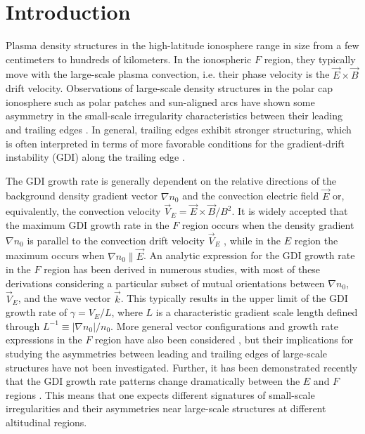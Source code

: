 \section{Introduction}
\label{sec:p2intro}
Plasma density structures in the high-latitude ionosphere range in size from a few centimeters to hundreds of kilometers. In the ionospheric \(F\) region, they typically move with the large-scale plasma convection, i.e. their phase velocity is the \(\vec{E}\times\vec{B}\) drift velocity.  Observations of large-scale density structures in the polar cap ionosphere such as polar patches and sun-aligned arcs have shown some asymmetry in the small-scale irregularity characteristics between their leading and trailing edges \citep[e.g.][]{Weber1984}. In general, trailing edges exhibit stronger structuring, which is often interpreted in terms of more favorable conditions for the gradient-drift instability (GDI) along the trailing edge \citep{Weber1984,Milan2002a, Koustov2012,Moen2012}.


The GDI growth rate is generally dependent on the relative directions of the background density gradient vector \(\nabla n_0\) and the convection electric field \(\vec{E}\) or, equivalently, the convection velocity \(\vec{V}_E=\vec{E}\times\vec{B}/B^2\). It is widely accepted that the maximum GDI growth rate in the \(F\) region occurs when the density gradient \(\nabla n_0\) is parallel to the convection drift velocity \(\vec{V}_E\) \citep{Keskinen1982}, while in the \(E\) region the maximum occurs when \(\nabla n_0\parallel \vec{E}\). An analytic expression for the GDI growth rate in the \(F\) region has been derived in numerous studies, with most of these derivations considering a particular subset of mutual orientations between \(\nabla n_0\), \(\vec{V}_E\), and the wave vector \(\vec{k}\). This typically results in the upper limit of the GDI growth rate of \(\gamma=V_E/L\), where \(L\) is a characteristic gradient scale length defined through \(L^{-1}\equiv |\nabla n_0|/n_0\). More general vector configurations and growth rate expressions in the \(F\) region have also been considered \citep{Keskinen1982,Makarevich2014c}, but their implications for studying the asymmetries between leading and trailing edges of large-scale structures have not been investigated. Further, it has been demonstrated recently that the GDI growth rate patterns change dramatically between the \(E\) and \(F\) regions \citep{Makarevich2014c}. This means that one expects different signatures of small-scale irregularities and their asymmetries near large-scale structures at different altitudinal regions.


